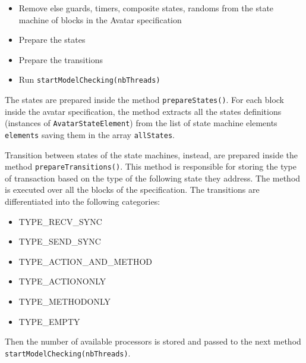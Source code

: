 \documentclass[12pt]{article}
\begin{document}
\begin{itemize}
\item Remove else guards, timers, composite states, randoms from the state machine of blocks in the Avatar specification
\item Prepare the states
\item Prepare the transitions
\item Run \texttt{startModelChecking(nbThreads)}
\end{itemize}
The states are prepared inside the method \texttt{prepareStates()}. For each block inside the avatar specification, the method extracts all the states definitions (instances of \texttt{AvatarStateElement}) from the list of state machine elements \texttt{elements} saving them in the array \texttt{allStates}.

Transition between states of the state machines, instead, are prepared inside the method \texttt{prepareTransitions()}. This method is responsible for storing the type of transaction based on the type of the following state they address. The method is executed over all the blocks of the specification. The transitions are differentiated into the following categories:
\begin{itemize}
\item TYPE\_RECV\_SYNC
\item TYPE\_SEND\_SYNC
\item TYPE\_ACTION\_AND\_METHOD
\item TYPE\_ACTIONONLY
\item TYPE\_METHODONLY
\item TYPE\_EMPTY
\end{itemize}
Then the number of available processors is stored and passed to the next method \texttt{startModelChecking(nbThreads)}.
\end{document}
